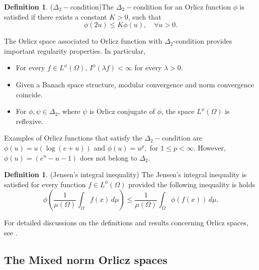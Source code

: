 \documentclass[11pt, a4paper]{article}
\theoremstyle{definition}
\newtheorem{defin}[thm]{Definition}
\numberwithin{equation}{section}
\begin{document}
\begin{defin}($\Delta_2-$condition)\label{delta2}
    The $\Delta_2-$condition for an Orlicz function $\phi$ is satisfied if there exists a constant  $K>0$,  such that $$\phi(2u)\leq K\phi(u), \quad \forall u>0.$$
\end{defin}
The Orlicz space associated to Orlicz function with $\Delta_2$-condition provides important regularity properties. In particular,
\begin{itemize}[itemsep=0pt]
    \item For every $f\in L^{\phi}(\Omega)$, $I^{\phi}(\lambda f)<\infty$ for every $\lambda>0$.
    
    \item Given a Banach space structure, modular convergence and norm convergence coincide.
    
    \item For $\phi, \psi\in \Delta_2$, where $\psi$ is Orlicz conjugate of $\phi$, the space $L^{\phi}(\Omega)$ is reflexive.
\end{itemize}
Examples of Orlicz functions that satisfy the $\Delta_{2}-$condition are  $\displaystyle \phi(u)=u(\log(e+u))$ and $\displaystyle \phi(u)=u^p,$ for $ 1 \leq p <\infty$. However, $\phi(u)=(e^u-u-1)$ does not belong to $\Delta_{2}$. 

\begin{defin}(Jensen's integral inequality) 
    The Jensen's integral inequality  is satisfied for every function \( f \in L^{\phi}(\Omega) \) provided the following inequality is holds 
    \[ \phi\left( \frac{1}{\mu(\Omega)}\int_\Omega f(x)\,d\mu\right) \leq \frac{1}{\mu(\Omega)}\displaystyle \int_\Omega \phi(f(x))\,d\mu.\]
\end{defin}

For detailed discussions on the definitions and results concerning Orlicz spaces, see \cite{or1, 2,orlicz, 1,  mode, mod, Raobook, orliczapp}.

\subsection{The Mixed norm Orlicz spaces}
\end{document}
